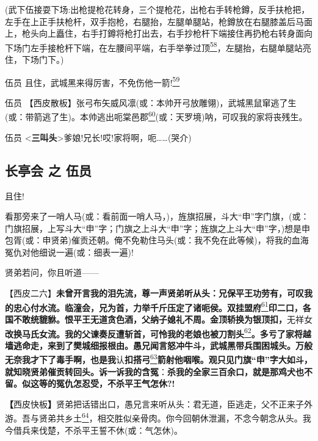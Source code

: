 (武下伍接耍下场:出枪提枪花转身，三个提枪花，出枪右手转枪鐏，反手扶枪把，左手在上正手扶枪杆，双手抱枪，右腿抬，左腿单腿站，枪鐏放在右腿膝盖后马面上，枪头向上矗住，右手打鐏将枪打出去，右手抄枪杆下端接住再扔枪右转身面向下场门左手接枪杆下端，在左腰间平端，右手举拳过顶\protect\hyperlink{fn58}{\textsuperscript{58}}，左腿抬，右腿单腿站亮住，下场门下。)

伍员
且住，武城黑来得厉害，不免伤他一箭!\protect\hyperlink{fn59}{\textsuperscript{59}}

伍员
【西皮散板】张弓布矢威风凛(或：本帅开弓放雕翎)，武城黑鼠窜逃了生(或：带箭逃了生)。本帅逃出呃棠邑郡\protect\hyperlink{fn60}{\textsuperscript{60}}(或：天罗境)呐，可叹我的家将丧残生。

伍员
\textless{}\textbf{三叫头}\textgreater{}爹娘!兄长!哎!家将啊，呃\ldots{}\ldots{}(哭介)

\newpage
\hypertarget{ux957fux4eadux4f1a-ux4e4b-ux4f0dux5458}{%
\subsection{长亭会 之
伍员}\label{ux957fux4eadux4f1a-ux4e4b-ux4f0dux5458}}

且住!

看那旁来了一哨人马(或：看前面一哨人马，)，旌旗招展，斗大``申''字门旗，(或：门旗招展，上写斗大``申''字；门旗之上斗大``申''字；旌旗之上斗大``申''字，)想是申包胥(或：申贤弟)催贡还朝。俺不免勒住马头(或：我不免在此等候)，将我的血海冤仇对他细说一遍(或：细表一遍)!

贤弟若问，你且听道------

【西皮二六】\textbf{未曾开言我的泪先流，尊一声贤弟听从头：兄保平王功劳有，可叹我的忠心付水流。临潼会，兄为首，力举千斤压定了诸呃侯。双挂盟府}\protect\hyperlink{fn61}{\textsuperscript{61}}\textbf{印二口，各国不敢统貔貅。恨平王无道贪色酒，父纳子媳礼不周。金顶轿换为银顶扣，}无祥女\textbf{改换马氏女流。我的父谏奏反遭斩首，可怜我的老娘也被刀割头}\protect\hyperlink{fn62}{\textsuperscript{62}}\textbf{。多亏了家将越墙逃命走，来到了樊城细报根由。愚兄闻言怒冲牛斗，武城黑带兵围困城头。万般无奈我才下了毒手啊，也是我}认\textbf{扣搭弓}\protect\hyperlink{fn63}{\textsuperscript{63}}\textbf{箭射他咽喉。观只见门旗``申''字大如斗，就知晓贤弟催贡转回头。诉一诉我的含冤}：\textbf{杀我的全家三百余口，就是那鸡犬也不留。似这等的冤仇怎忍受，不杀平王气怎休​?!}

\textbf{【}西皮快板\textbf{】}贤弟把话错出口，愚兄言来听从头：君无道，臣逃走，父不正来子外游。吾与贤弟共乡土\protect\hyperlink{fn64}{\textsuperscript{64}}，相交胜似亲骨肉。你今回朝休泄漏，不念今朝念从头。我今借兵来伐楚，不杀平王誓不休(或：气怎休)。

